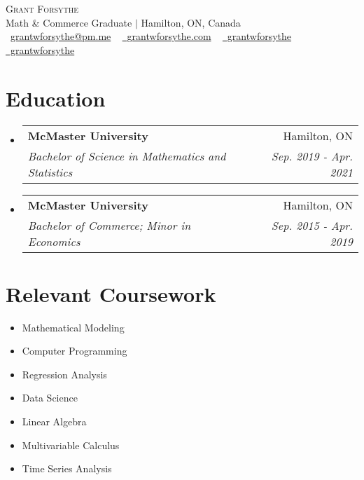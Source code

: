 \documentclass[letterpaper,11pt]{article}
\makeatletter
\newcommand{\resumeSubheading}[4]{
  \vspace{-2pt}\item
    \begin{tabular*}{1.0\textwidth}[t]{l@{\extracolsep{\fill}}r}
      \textbf{#1} & #2 \\
      \textit{\small#3} & \textit{\small #4} \\
    \end{tabular*}\vspace{-7pt}
}
\newcommand{\resumeSubHeadingListStart}{\begin{itemize}[leftmargin=0.0in, label={}]}
\newcommand{\resumeSubHeadingListEnd}{\end{itemize}}
\makeatother
\begin{document}
\begin{center}
    {\Huge \scshape Grant Forsythe} \\ \vspace{1pt}
    Math \& Commerce Graduate $\vert$ Hamilton, ON, Canada \\ \vspace{1pt}
    \small \raisebox{-0.1\height}\faAt\ \href{mailto:grantwforsythe@pm.me}{grantwforsythe@pm.me} ~ \href{https://www.grantwforsythe.com}{\raisebox{-0.2\height}\faGlobe\  grantwforsythe.com} ~ 
    \href{https://linkedin.com/in/grantwforsythe/}{\raisebox{-0.2\height}\faLinkedin\ grantwforsythe}  ~
    \href{https://github.com/grantwforsythe}{\raisebox{-0.2\height}\faGithub\ grantwforsythe}
    \vspace{-8pt}
\end{center}

\section{Education}
  \resumeSubHeadingListStart
    \resumeSubheading
      {McMaster University}{Hamilton, ON}
      {Bachelor of Science in Mathematics and Statistics}{Sep. 2019 - Apr. 2021}
    \resumeSubheading
      {McMaster University}{Hamilton, ON}
      {Bachelor of Commerce; Minor in Economics}{Sep. 2015 - Apr. 2019}
  \resumeSubHeadingListEnd
\vspace{-13pt} 

\section{Relevant Coursework}
        \begin{multicols}{4}
            \begin{itemize}[itemsep=-5pt, parsep=3pt]
                \item\small Mathematical Modeling
                \item Computer Programming
                \item Regression Analysis
                \item Data Science
                \item Linear Algebra
                \item Multivariable Calculus
                \item Time Series Analysis
            \end{itemize}
        \end{multicols}
        \vspace*{2.0\multicolsep}
\vspace{3pt}
\end{document}

